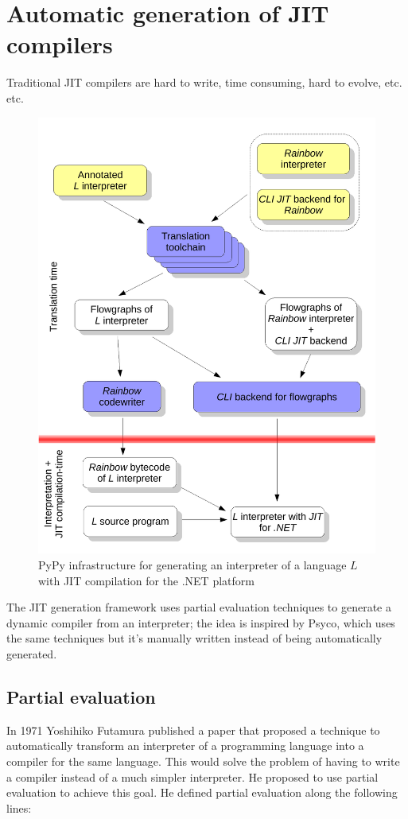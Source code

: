 \section{Automatic generation of JIT compilers}

Traditional JIT compilers are hard to write, time consuming, hard to evolve,
etc. etc.

\begin{figure}[h]
\begin{center}
\includegraphics[width=.6\textwidth]{diagram1}
\caption{PyPy infrastructure for generating an interpreter of a
  language $L$ with JIT compilation for the .NET platform}
\end{center}
\end{figure}

The JIT generation framework uses partial evaluation techniques to generate a
dynamic compiler from an interpreter; the idea is inspired by Psyco, which
uses the same techniques but it's manually written instead of being
automatically generated.

\subsection{Partial evaluation}

In 1971 Yoshihiko Futamura published a paper \cite{Futamura99} that proposed a
technique to automatically transform an interpreter of a programming language
into a compiler for the same language. This would solve the problem of having to
write a compiler instead of a much simpler interpreter. He proposed to use
partial evaluation to achieve this goal. He defined partial evaluation along the following lines:

